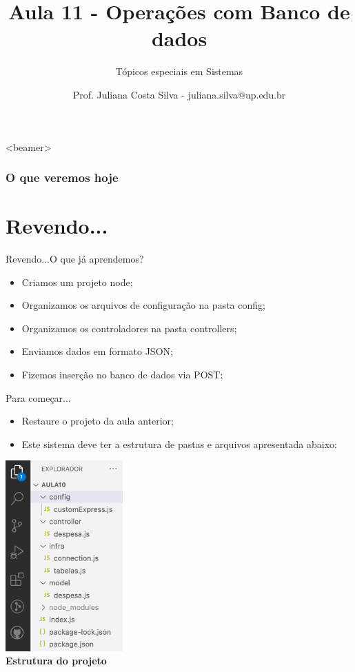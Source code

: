 \documentclass{beamer}
\title{Aula 11  - Operações com Banco de dados}
\subtitle{Tópicos especiais em Sistemas}
\author{Prof. Juliana Costa Silva - juliana.silva@up.edu.br}
\begin{document}
  \frame[c]{\maketitle}
      \begin{frame}<beamer>
      \frametitle{O que veremos hoje}
      \tableofcontents
    \end{frame}
    \section{Revendo...}
    \begin{frame}{Revendo...}{O que já aprendemos?}
      
      \begin{itemize}
            \item Criamos um projeto node;
            \item Organizamos os arquivos de configuração na pasta config;
            \item Organizamos os controladores na pasta controllers;
            \item Enviamos dados em formato JSON;
            \item Fizemos inserção no banco de dados via POST;
       \end{itemize}
     \end{frame}
\begin{frame}[label=proof]{Para começar...}
	\begin{itemize}
	\item Restaure o projeto da aula anterior;
	\item Este sistema deve ter a estrutura de pastas e arquivos apresentada abaixo:
	\end{itemize}
	\begin{center}
	    \includegraphics[width=45mm]{aulas/resources/aula11_2.png} \\ \tiny{\textbf{Estrutura do projeto}}
	\end{center}
    \end{frame}
\end{document}
